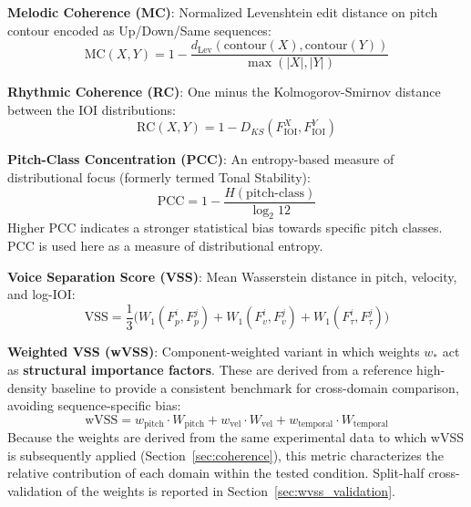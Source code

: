 \documentclass[a4paper]{article}
\theoremstyle{definition}
\theoremstyle{remark}
\begin{document}
\textbf{Melodic Coherence (MC)}: Normalized Levenshtein edit distance on pitch contour encoded as Up/Down/Same sequences:
\begin{equation}
    \text{MC}(X, Y) = 1 - \frac{d_{\text{Lev}}(\text{contour}(X), \text{contour}(Y))}{\max(|X|, |Y|)}
\label{eq:mc}
\end{equation}

\textbf{Rhythmic Coherence (RC)}: One minus the Kolmogorov-Smirnov distance between the IOI distributions:
\begin{equation}
    \text{RC}(X, Y) = 1 - D_{KS}(F_{\text{IOI}}^X, F_{\text{IOI}}^Y)
\end{equation}

\textbf{Pitch-Class Concentration (PCC)}: An entropy-based measure of distributional focus (formerly termed Tonal Stability):
\begin{equation}
    \text{PCC} = 1 - \frac{H(\text{pitch-class})}{\log_2 12}
\label{eq:pcc}
\end{equation}
Higher PCC indicates a stronger statistical bias towards specific pitch classes. PCC is used here as a measure of distributional entropy.

\textbf{Voice Separation Score (VSS)}: Mean Wasserstein distance in pitch, velocity, and log-IOI:
\begin{equation}
    \text{VSS} = \frac{1}{3}\bigl(W_1(F_p^i, F_p^j) + W_1(F_v^i, F_v^j) + W_1(F_\tau^i, F_\tau^j)\bigr)
\end{equation}

\textbf{Weighted VSS (wVSS)}: Component-weighted variant in which weights $w_*$ act as \textbf{structural importance factors}. These are derived from a reference high-density baseline to provide a consistent benchmark for cross-domain comparison, avoiding sequence-specific bias:
\begin{equation}
    \text{wVSS} = w_{\text{pitch}} \cdot W_{\text{pitch}} + w_{\text{vel}} \cdot W_{\text{vel}} + w_{\text{temporal}} \cdot W_{\text{temporal}}
\label{eq:wvss}
\end{equation}
Because the weights are derived from the same experimental data to which wVSS is subsequently applied (Section~\ref{sec:coherence}), this metric characterizes the relative contribution of each domain within the tested condition. Split-half cross-validation of the weights is reported in Section~\ref{sec:wvss_validation}.
\end{document}
